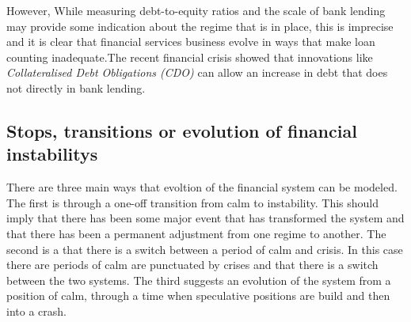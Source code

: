 \documentclass[12pt, a4paper, oneside]{article} %
\begin{document}

However, While measuring debt-to-equity ratios and the scale of bank lending may provide some indication about the regime that is in place, this is imprecise and it is clear that financial services business evolve in ways that make loan counting  inadequate.The recent financial crisis showed that innovations like \emph{Collateralised Debt Obligations (CDO)} can allow an increase in debt that does not directly in bank lending. 

\subsection{Stops, transitions or evolution of financial instabilitys}
There are three main ways that evoltion of the financial system can be modeled.  The first is through a one-off transition from calm to instability. This should imply that there has been some major event that has transformed the system and that there has been a permanent adjustment from one regime to another.  The second is a that there is a switch between a period of calm and crisis.  In this case there are periods of calm are punctuated by crises and that there is a switch between the two systems. The third suggests an evolution of the system from a position of calm, through a time when speculative positions are build and then into a crash. 
\end{document}
